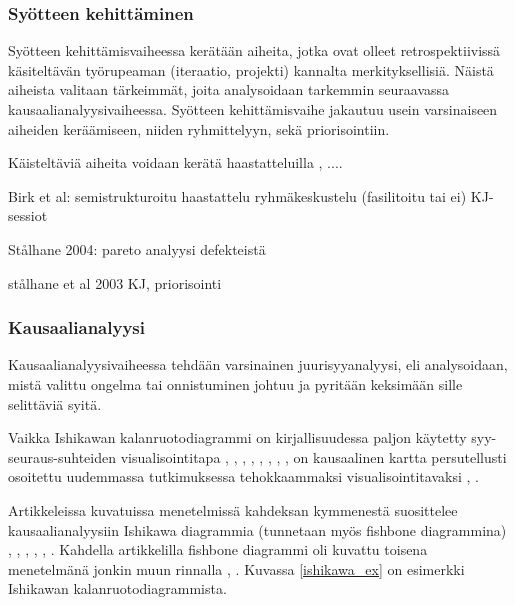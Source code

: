 \subsubsection{Syötteen kehittäminen}
Syötteen kehittämisvaiheessa kerätään aiheita, jotka ovat olleet retrospektiivissä käsiteltävän työrupeaman (iteraatio, projekti) kannalta merkityksellisiä. Näistä aiheista valitaan tärkeimmät, joita analysoidaan tarkemmin seuraavassa kausaalianalyysivaiheessa. Syötteen kehittämisvaihe jakautuu usein varsinaiseen aiheiden keräämiseen, niiden ryhmittelyyn, sekä priorisointiin.

Käisteltäviä aiheita voidaan kerätä haastatteluilla \citep{birk2002postmortem}, ....

Birk et al:
semistrukturoitu haastattelu
ryhmäkeskustelu (fasilitoitu tai ei)
KJ-sessiot

Stålhane 2004:
pareto analyysi defekteistä

stålhane et al 2003
KJ, priorisointi



\subsubsection{Kausaalianalyysi}
Kausaalianalyysivaiheessa tehdään varsinainen juurisyyanalyysi, eli analysoidaan, mistä valittu ongelma tai onnistuminen johtuu ja pyritään keksimään sille selittäviä syitä. 

Vaikka Ishikawan kalanruotodiagrammi on kirjallisuudessa paljon käytetty syy-seuraus-suhteiden visualisointitapa \citep{kalinowski2012evidence}, \citep{Bjornson2009}, \citep{de2004learning}, \citep{staalhane2004root}, \citep{dingsoyr2003extending}, \citep{staalhane2003post}, \citep{birk2002postmortem}, \citep{card1998learning}, on kausaalinen kartta persutellusti osoitettu uudemmassa tutkimuksessa tehokkaammaksi visualisointitavaksi \citep{Bjornson2009}, \citep{Lehtinen2011}. 

Artikkeleissa kuvatuissa menetelmissä kahdeksan kymmenestä suosittelee kausaalianalyysiin Ishikawa diagrammia (tunnetaan myös fishbone diagrammina) \citep{kalinowski2012evidence}, \citep{de2004learning}, \citep{staalhane2004root}, \citep{dingsoyr2003extending}, \citep{birk2002postmortem}, \citep{card1998learning}. Kahdella artikkelilla fishbone diagrammi oli kuvattu toisena menetelmänä jonkin muun rinnalla \citep{Bjornson2009}, \citep{staalhane2003post}. Kuvassa \ref{ishikawa_ex} on esimerkki Ishikawan kalanruotodiagrammista.

